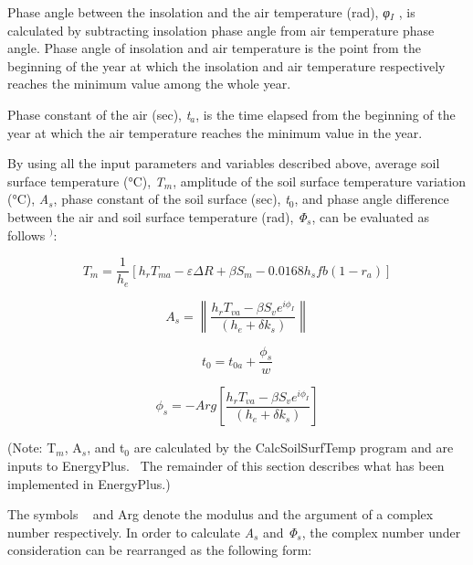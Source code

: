Phase angle between the insolation and the air temperature (rad), \emph{φ\(_{I}\)} , is calculated by subtracting insolation phase angle from air temperature phase angle. Phase angle of insolation and air temperature is the point from the beginning of the year at which the insolation and air temperature respectively reaches the minimum value among the whole year.

Phase constant of the air (sec), \emph{t\(_{a}\)}, is the time elapsed from the beginning of the year at which the air temperature reaches the minimum value in the year.

By using all the input parameters and variables described above, average soil surface temperature (°C), \emph{T\(_{m}\)}, amplitude of the soil surface temperature variation (°C), \emph{A\(_{s}\)}, phase constant of the soil surface (sec), \emph{t\(_{0}\)}, and phase angle difference between the air and soil surface temperature (rad), \emph{Φ\(_{s}\)}, can be evaluated as follows \(^{)}\):

\begin{equation}
{T_m} = \frac{1}{{{h_e}}}\left[ {{h_r}{T_{ma}} - \varepsilon \Delta R + \beta {S_m} - 0.0168{h_s}fb\left( {1 - {r_a}} \right)} \right]
\end{equation}

\begin{equation}
{A_s} = \left\| {\frac{{{h_r}{T_{va}} - \beta {S_v}{e^{i{\phi_I}}}}}{{\left( {{h_e} + \delta {k_s}} \right)}}} \right\|
\end{equation}

\begin{equation}
{t_0} = {t_{0a}} + \frac{{{\phi_s}}}{w}
\end{equation}

\begin{equation}
{\phi_s} =  - Arg\left[ {\frac{{{h_r}{T_{va}} - \beta {S_v}{e^{i{\phi_I}}}}}{{\left( {{h_e} + \delta {k_s}} \right)}}} \right]
\end{equation}

(Note: T\(_{m}\), A\(_{s}\), and t\(_{0}\) are calculated by the CalcSoilSurfTemp program and are inputs to EnergyPlus.~ The remainder of this section describes what has been implemented in EnergyPlus.)

The symbols \textbar{}\textbar{}~ \textbar{}\textbar{} and Arg denote the modulus and the argument of a complex number respectively. In order to calculate \emph{A\(_{s}\)} and \emph{Φ\(_{s}\)}, the complex number under consideration can be rearranged as the following form:


